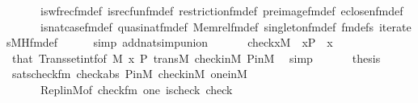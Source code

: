 \begin{isabellebody}
\ \ \ \ \ \ is{\isacharunderscore}{\kern0pt}wfrec{\isacharunderscore}{\kern0pt}fm{\isacharunderscore}{\kern0pt}def\ is{\isacharunderscore}{\kern0pt}recfun{\isacharunderscore}{\kern0pt}fm{\isacharunderscore}{\kern0pt}def\ restriction{\isacharunderscore}{\kern0pt}fm{\isacharunderscore}{\kern0pt}def\ pre{\isacharunderscore}{\kern0pt}image{\isacharunderscore}{\kern0pt}fm{\isacharunderscore}{\kern0pt}def\ eclose{\isacharunderscore}{\kern0pt}n{\isacharunderscore}{\kern0pt}fm{\isacharunderscore}{\kern0pt}def\isanewline
\ \ \ \ \ \ is{\isacharunderscore}{\kern0pt}nat{\isacharunderscore}{\kern0pt}case{\isacharunderscore}{\kern0pt}fm{\isacharunderscore}{\kern0pt}def\ quasinat{\isacharunderscore}{\kern0pt}fm{\isacharunderscore}{\kern0pt}def\ Memrel{\isacharunderscore}{\kern0pt}fm{\isacharunderscore}{\kern0pt}def\ singleton{\isacharunderscore}{\kern0pt}fm{\isacharunderscore}{\kern0pt}def\ fm{\isacharunderscore}{\kern0pt}defs\ iterates{\isacharunderscore}{\kern0pt}MH{\isacharunderscore}{\kern0pt}fm{\isacharunderscore}{\kern0pt}def\isanewline
\ \ \ \ \isamarkupfalse%
\ {\isacharparenleft}{\kern0pt}simp\ add{\isacharcolon}{\kern0pt}nat{\isacharunderscore}{\kern0pt}simp{\isacharunderscore}{\kern0pt}union{\isacharparenright}{\kern0pt}\isanewline
\ \ \isamarkupfalse%
\isanewline
\ \ \isamarkupfalse%
\ {\isachardoublequoteopen}check{\isacharparenleft}{\kern0pt}x{\isacharparenright}{\kern0pt}{\isasymin}M{\isachardoublequoteclose}\ \ {\isachardoublequoteopen}x{\isasymin}P{\isachardoublequoteclose}\ \ x\isanewline
\ \ \ \ \isamarkupfalse%
\ that\ Transset{\isacharunderscore}{\kern0pt}intf{\isacharbrackleft}{\kern0pt}of\ M\ x\ P{\isacharbrackright}{\kern0pt}\ trans{\isacharunderscore}{\kern0pt}M\ check{\isacharunderscore}{\kern0pt}in{\isacharunderscore}{\kern0pt}M\ P{\isacharunderscore}{\kern0pt}in{\isacharunderscore}{\kern0pt}M\ \isamarkupfalse%
\ simp\isanewline
\ \ \isamarkupfalse%
\isanewline
\ \ \isamarkupfalse%
\ {\isacharquery}{\kern0pt}thesis\ \isamarkupfalse%
\ sats{\isacharunderscore}{\kern0pt}check{\isacharunderscore}{\kern0pt}fm\ check{\isacharunderscore}{\kern0pt}abs\ P{\isacharunderscore}{\kern0pt}in{\isacharunderscore}{\kern0pt}M\ check{\isacharunderscore}{\kern0pt}in{\isacharunderscore}{\kern0pt}M\ one{\isacharunderscore}{\kern0pt}in{\isacharunderscore}{\kern0pt}M\isanewline
\ \ \ \ \ \ Repl{\isacharunderscore}{\kern0pt}in{\isacharunderscore}{\kern0pt}M{\isacharbrackleft}{\kern0pt}of\ {\isachardoublequoteopen}check{\isacharunderscore}{\kern0pt}fm{\isacharparenleft}{\kern0pt}{}{\isacharcomma}{\kern0pt}{}{\isacharcomma}{\kern0pt}{}{\isacharparenright}{\kern0pt}{\isachardoublequoteclose}\ {\isachardoublequoteopen}{\isacharbrackleft}{\kern0pt}one{\isacharbrackright}{\kern0pt}{\isachardoublequoteclose}\ is{\isacharunderscore}{\kern0pt}check\ check{\isacharbrackright}{\kern0pt}\ \isamarkupfalse%

\end{isabellebody}
